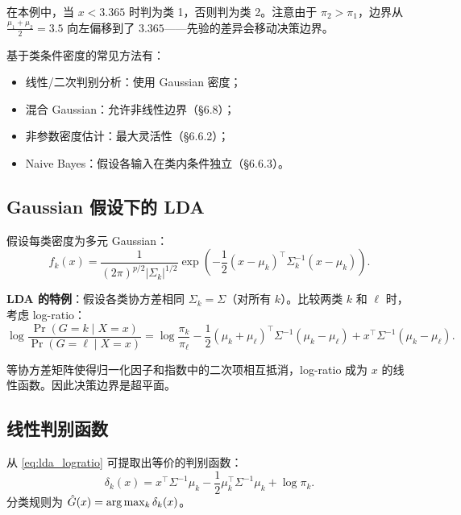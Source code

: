在本例中，当 $x < 3.365$ 时判为类 1，否则判为类 2。注意由于 $\pi_2 > \pi_1$，边界从 $\frac{\mu_1+\mu_2}{2}=3.5$ 向左偏移到了 $3.365$——先验的差异会移动决策边界。


基于类条件密度的常见方法有：
\begin{itemize}
    \item 线性/二次判别分析：使用 Gaussian 密度；
    \item 混合 Gaussian：允许非线性边界（§6.8）；
    \item 非参数密度估计：最大灵活性（§6.6.2）；
    \item Naive Bayes：假设各输入在类内条件独立（§6.6.3）。
\end{itemize}

\subsection{Gaussian 假设下的 LDA}

假设每类密度为多元 Gaussian：
\begin{equation}\label{eq:gaussian_density}
    f_k(x) = \frac{1}{(2\pi)^{p/2} |\Sigma_k|^{1/2}}
    \exp\!\left(-\frac{1}{2}(x - \mu_k)^\top \Sigma_k^{-1}(x - \mu_k)\right).
\end{equation}

\textbf{LDA 的特例}：假设各类协方差相同 $\Sigma_k = \Sigma$（对所有 $k$）。比较两类 $k$ 和 $\ell$ 时，考虑 log-ratio：
\begin{equation}\label{eq:lda_logratio}
    \log\frac{\Pr(G = k \mid X = x)}{\Pr(G = \ell \mid X = x)}
    = \log\frac{\pi_k}{\pi_\ell}
    - \frac{1}{2}(\mu_k + \mu_\ell)^\top \Sigma^{-1}(\mu_k - \mu_\ell)
    + x^\top \Sigma^{-1}(\mu_k - \mu_\ell).
\end{equation}

\begin{remark}
等协方差矩阵使得归一化因子和指数中的二次项相互抵消，log-ratio 成为 $x$ 的线性函数。因此决策边界是超平面。
\end{remark}

\subsection{线性判别函数}

从 \eqref{eq:lda_logratio} 可提取出等价的判别函数：
\begin{equation}\label{eq:lda_discriminant}
    \delta_k(x) = x^\top \Sigma^{-1} \mu_k - \frac{1}{2} \mu_k^\top \Sigma^{-1} \mu_k + \log \pi_k.
\end{equation}
分类规则为 $\hat{G}(x) = \arg\max_k \delta_k(x)$。

